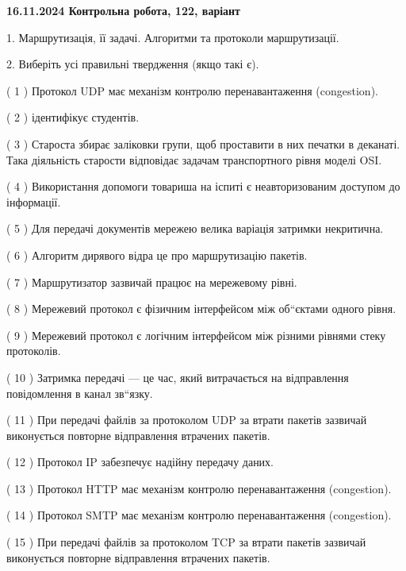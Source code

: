 \documentclass[12pt, ukrainian]{article}
\begin{document}
\vspace{4mm}
\newpage
\begin {large}

\textbf{16.11.2024 Контрольна робота, 122, варіант  }\par


{
1. Маршрутизація, її задачі. Алгоритми та протоколи маршрутизації.



\vspace{5mm}
2. Виберіть усі правильні твердження (якщо такі є).\par
\vspace{2mm}

( 1 ) Протокол UDP має механізм контролю перенавантаження (congestion).

( 2 ) ідентифікує студентів.

( 3 ) Староста збирає заліковки групи, щоб проставити в них печатки в деканаті. Така діяльність старости відповідає задачам транспортного рівня моделі OSI.

( 4 ) Використання допомоги товариша на іспиті є неавторизованим доступом до інформації.

( 5 ) Для передачі документів мережею велика варіація затримки некритична.

( 6 ) Алгоритм дирявого відра це про маршрутизацію пакетів.

( 7 ) Маршрутизатор зазвичай працює на мережевому рівні.

( 8 ) Мережевий протокол є фізичним інтерфейсом між об“єктами одного рівня.

( 9 ) Мережевий протокол є логічним інтерфейсом між різними рівнями стеку протоколів.

( 10 ) Затримка передачі — це час, який витрачається на відправлення повідомлення в канал зв“язку.

( 11 ) При передачі файлів за протоколом UDP за втрати пакетів зазвичай виконується повторне відправлення втрачених пакетів.

( 12 ) Протокол IP забезпечує надійну передачу даних.

( 13 ) Протокол HTTP має механізм контролю перенавантаження (congestion).

( 14 ) Протокол SMTP має механізм контролю перенавантаження (congestion).

( 15 ) При передачі файлів за протоколом TCP за втрати пакетів зазвичай виконується повторне відправлення втрачених пакетів.
}
\end {large}
\end{document}
